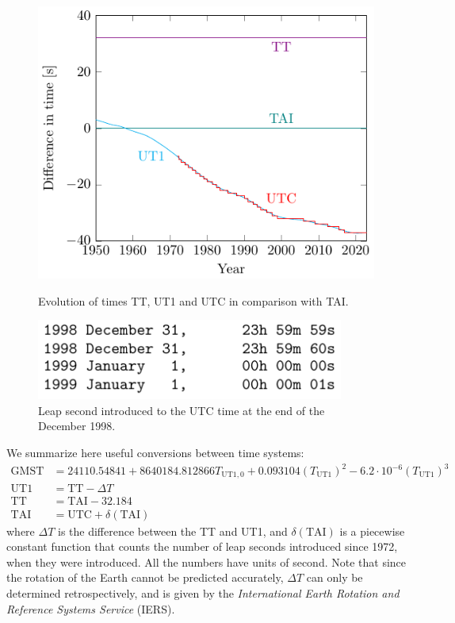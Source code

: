 \documentclass[../main.tex]{subfiles}
\begin{document}
\begin{figure}[htbp]
  \centering
  \begin{minipage}[ht]{0.45\textwidth}
    \centering
    \includegraphics[width=\textwidth]{Images/time_graph.pdf}
    \caption{Evolution of times TT, UT1 and UTC in comparison with TAI. \cite{iersDeltaT}}
    \label{fig:time_graph}
  \end{minipage}
  \hfill
  \begin{minipage}[ht]{0.45\textwidth}
    \centering
    \includegraphics[width=0.9\textwidth]{Images/leap_second.pdf}
    \caption{Leap second introduced to the UTC time at the end of the December 1998. \cite{iersbulletinC}}
    \label{fig:leapsecond}
  \end{minipage}
\end{figure}
We summarize here useful conversions between time systems:
\begin{align*}
  \text{GMST} & =24110.54841+8640184.812866{T_{\text{UT1},0}}+0.093104{(T_\text{UT1})}^2-6.2\cdot 10^{-6}{(T_\text{UT1})}^3 \\
  \text{UT1}  & =\text{TT}-\Delta T                                                                                         \\
  \text{TT}   & =\text{TAI}-32.184                                                                                          \\
  \text{TAI}  & =\text{UTC}+\delta(\text{TAI})
\end{align*}
where $\Delta T$ is the difference between the TT and UT1, and $\delta(\text{TAI})$ is a piecewise constant function that counts the number of leap seconds introduced since 1972, when they were introduced. All the numbers have units of second. Note that since the rotation of the Earth cannot be predicted accurately, $\Delta T$ can only be determined retrospectively, and is given by the \emph{International Earth Rotation and Reference Systems Service} (IERS).
\end{document}
